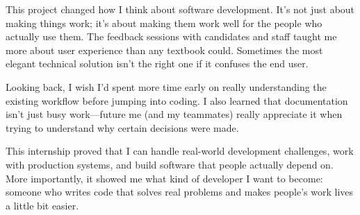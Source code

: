 This project changed how I think about software development. It's not just about making things work; it's about making them work well for the people who actually use them. The feedback sessions with candidates and staff taught me more about user experience than any textbook could. Sometimes the most elegant technical solution isn't the right one if it confuses the end user.

Looking back, I wish I'd spent more time early on really understanding the existing workflow before jumping into coding. I also learned that documentation isn't just busy work—future me (and my teammates) really appreciate it when trying to understand why certain decisions were made.

This internship proved that I can handle real-world development challenges, work with production systems, and build software that people actually depend on. More importantly, it showed me what kind of developer I want to become: someone who writes code that solves real problems and makes people's work lives a little bit easier.
